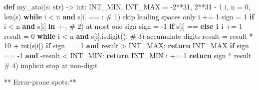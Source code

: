 \documentclass[11pt]{article}
\newenvironment{Shaded}{\begin{snugshade}}{\end{snugshade}}
\newcommand{\BuiltInTok}[1]{\textcolor[rgb]{0.50,0.55,0.55}{#1}}
\newcommand{\CommentTok}[1]{\textcolor[rgb]{0.48,0.49,0.49}{#1}}
\newcommand{\ControlFlowTok}[1]{\textcolor[rgb]{0.99,0.74,0.29}{\textbf{#1}}}
\newcommand{\DecValTok}[1]{\textcolor[rgb]{0.96,0.45,0.00}{#1}}
\newcommand{\KeywordTok}[1]{\textcolor[rgb]{0.81,0.81,0.76}{\textbf{#1}}}
\newcommand{\NormalTok}[1]{\textcolor[rgb]{0.81,0.81,0.76}{#1}}
\newcommand{\OperatorTok}[1]{\textcolor[rgb]{0.81,0.81,0.76}{#1}}
\newcommand{\StringTok}[1]{\textcolor[rgb]{0.96,0.31,0.31}{#1}}
\begin{document}
\begin{Shaded}
\begin{Highlighting}[]
\KeywordTok{def}\NormalTok{ my\_atoi(s: }\BuiltInTok{str}\NormalTok{) }\OperatorTok{{-}\textgreater{}} \BuiltInTok{int}\NormalTok{:}
\NormalTok{    INT\_MIN, INT\_MAX }\OperatorTok{=} \OperatorTok{{-}}\DecValTok{2}\OperatorTok{**}\DecValTok{31}\NormalTok{, }\DecValTok{2}\OperatorTok{**}\DecValTok{31} \OperatorTok{{-}} \DecValTok{1}
\NormalTok{    i, n }\OperatorTok{=} \DecValTok{0}\NormalTok{, }\BuiltInTok{len}\NormalTok{(s)}
    \ControlFlowTok{while}\NormalTok{ i }\OperatorTok{\textless{}}\NormalTok{ n }\KeywordTok{and}\NormalTok{ s[i] }\OperatorTok{==} \StringTok{\textquotesingle{} \textquotesingle{}}\NormalTok{:       }\CommentTok{\# 1) skip leading spaces only}
\NormalTok{        i }\OperatorTok{+=} \DecValTok{1}
\NormalTok{    sign }\OperatorTok{=} \DecValTok{1}
    \ControlFlowTok{if}\NormalTok{ i }\OperatorTok{\textless{}}\NormalTok{ n }\KeywordTok{and}\NormalTok{ s[i] }\KeywordTok{in} \StringTok{\textquotesingle{}+{-}\textquotesingle{}}\NormalTok{:         }\CommentTok{\# 2) at most one sign}
\NormalTok{        sign }\OperatorTok{=} \OperatorTok{{-}}\DecValTok{1} \ControlFlowTok{if}\NormalTok{ s[i] }\OperatorTok{==} \StringTok{\textquotesingle{}{-}\textquotesingle{}} \ControlFlowTok{else} \DecValTok{1}
\NormalTok{        i }\OperatorTok{+=} \DecValTok{1}
\NormalTok{    result }\OperatorTok{=} \DecValTok{0}
    \ControlFlowTok{while}\NormalTok{ i }\OperatorTok{\textless{}}\NormalTok{ n }\KeywordTok{and}\NormalTok{ s[i].isdigit():    }\CommentTok{\# 3) accumulate digits}
\NormalTok{        result }\OperatorTok{=}\NormalTok{ result }\OperatorTok{*} \DecValTok{10} \OperatorTok{+} \BuiltInTok{int}\NormalTok{(s[i])}
        \ControlFlowTok{if}\NormalTok{ sign }\OperatorTok{==} \DecValTok{1} \KeywordTok{and}\NormalTok{ result }\OperatorTok{\textgreater{}}\NormalTok{ INT\_MAX:}
            \ControlFlowTok{return}\NormalTok{ INT\_MAX}
        \ControlFlowTok{if}\NormalTok{ sign }\OperatorTok{==} \OperatorTok{{-}}\DecValTok{1} \KeywordTok{and} \OperatorTok{{-}}\NormalTok{result }\OperatorTok{\textless{}}\NormalTok{ INT\_MIN:}
            \ControlFlowTok{return}\NormalTok{ INT\_MIN}
\NormalTok{        i }\OperatorTok{+=} \DecValTok{1}
    \ControlFlowTok{return}\NormalTok{ sign }\OperatorTok{*}\NormalTok{ result               }\CommentTok{\# 4) implicit stop at non{-}digit}
\end{Highlighting}
\end{Shaded}

** Error-prone spots:**
\end{document}
